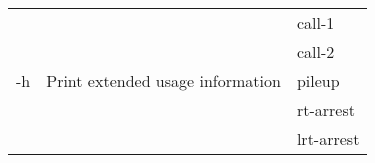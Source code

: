 {\small
\begin{tabular}{@{}p{}p{}l@{}}
\multirow{5}{=}{-h} & \multirow{5}{=}{Print extended usage information} & call-1 \\
 &  & call-2 \\
 &  & pileup \\
 &  & rt-arrest \\
 &  & lrt-arrest \\
\end{tabular}\\
}
